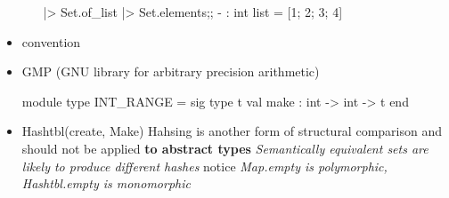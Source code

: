 \begin{itemize}
\begin{itemize}
\begin{alternate}
  [1;2;3;4] |> Set.of_list |> Set.elements;;
  - : int list = [1; 2; 3; 4]
\end{alternate}


  \end{itemize}
\item convention
\item GMP (GNU library for arbitrary precision arithmetic)

\begin{ocamlcode}
module type INT_RANGE = sig
type t
val make : int -> int -> t
end 
\end{ocamlcode}


\item Hashtbl(create, Make)
  Hahsing is another form of structural comparison and should not be applied
  {\bf to abstract types}
  \emph{Semantically equivalent sets are likely to produce different hashes}
  notice \textit{Map.empty is polymorphic, Hashtbl.empty is monomorphic}
\end{itemize}


